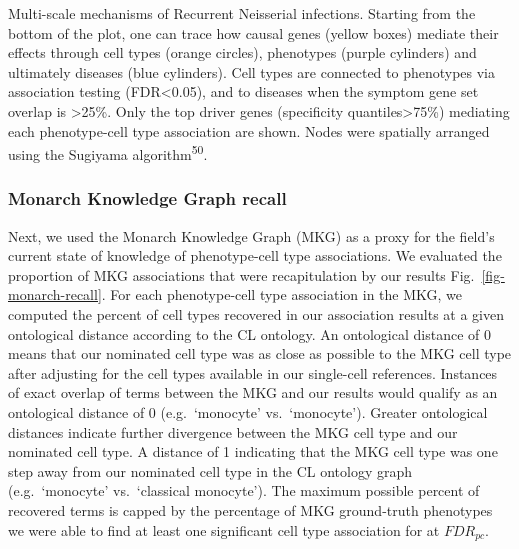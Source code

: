 \documentclass[
]{article}
\begin{document}
Multi-scale mechanisms of Recurrent Neisserial infections. Starting from
the bottom of the plot, one can trace how causal genes (yellow boxes)
mediate their effects through cell types (orange circles), phenotypes
(purple cylinders) and ultimately diseases (blue cylinders). Cell types
are connected to phenotypes via association testing (FDR\textless0.05),
and to diseases when the symptom gene set overlap is \textgreater25\%.
Only the top driver genes (specificity quantiles\textgreater75\%)
mediating each phenotype-cell type association are shown. Nodes were
spatially arranged using the Sugiyama algorithm\textsuperscript{50}.

\subsubsection{Monarch Knowledge Graph
recall}\label{monarch-knowledge-graph-recall}

Next, we used the Monarch Knowledge Graph (MKG) as a proxy for the
field's current state of knowledge of phenotype-cell type associations.
We evaluated the proportion of MKG associations that were recapitulation
by our results Fig.~\ref{fig-monarch-recall}. For each phenotype-cell
type association in the MKG, we computed the percent of cell types
recovered in our association results at a given ontological distance
according to the CL ontology. An ontological distance of 0 means that
our nominated cell type was as close as possible to the MKG cell type
after adjusting for the cell types available in our single-cell
references. Instances of exact overlap of terms between the MKG and our
results would qualify as an ontological distance of 0 (e.g.~`monocyte'
vs.~`monocyte'). Greater ontological distances indicate further
divergence between the MKG cell type and our nominated cell type. A
distance of 1 indicating that the MKG cell type was one step away from
our nominated cell type in the CL ontology graph (e.g.~`monocyte'
vs.~`classical monocyte'). The maximum possible percent of recovered
terms is capped by the percentage of MKG ground-truth phenotypes we were
able to find at least one significant cell type association for at
\(FDR_{pc}\).
\end{document}

